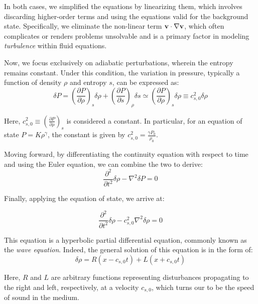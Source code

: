 In both cases, we simplified the equations by linearizing them, which involves discarding higher-order terms and using the equations valid for the background state. Specifically, we eliminate the non-linear term \( \vb v \cdot \nabla \vb v \), which often complicates or renders problems unsolvable and is a primary factor in modeling \emph{turbulence} within fluid equations.

Now, we focus exclusively on adiabatic perturbations, wherein the entropy remains constant. Under this condition, the variation in pressure, typically a function of density \( \rho \) and entropy \( s \), can be expressed as:
%
\begin{equation}
\delta P = \left( \frac{\partial P}{\partial \rho} \right)_s \delta \rho + \left( \frac{\partial P}{\partial s} \right)_\rho \delta s \simeq \left( \frac{\partial P}{\partial \rho} \right)_s \delta \rho \equiv c_{s,0}^2 \delta \rho
\end{equation}

Here, \( c_{s,0}^2 \equiv  \left( \frac{\partial P}{\partial \rho} \right)_s \) is considered a constant. In particular, for an equation of state \( P = K \rho^\gamma \), the constant is given by \( c_{s,0}^2 = \frac{\gamma P_0}{\rho_0} \).

Moving forward, by differentiating the continuity equation with respect to time and using the Euler equation, we can combine the two to derive:
%
\begin{equation}
\frac{\partial^2}{\partial t^2} \delta \rho - \nabla^2 \delta P = 0
\end{equation}

Finally, applying the equation of state, we arrive at:
%
\begin{remark}
\begin{equation}
\frac{\partial^2}{\partial t^2} \delta \rho - c_{s,0}^2 \nabla^2 \delta \rho = 0
\end{equation}
\end{remark}

This equation is a hyperbolic partial differential equation, commonly known as the \emph{wave equation}. 
%
Indeed, the general solution of this equation is in the form of:
%
\begin{equation}
\delta \rho = R(x - c_{s,0} t) + L (x + c_{s,0} t)
\end{equation}

Here, \( R \) and \( L \) are arbitrary functions representing disturbances propagating to the right and left, respectively, at a velocity \( c_{s,0} \), which turns our to be the speed of sound in the medium.

